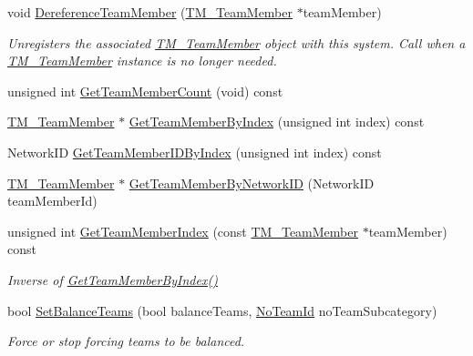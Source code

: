 \begin{DoxyCompactItemize}
void \hyperlink{class_rak_net_1_1_t_m___world_a165d4a76ef25f863832e2b161f5ad65e}{Dereference\-Team\-Member} (\hyperlink{class_rak_net_1_1_t_m___team_member}{T\-M\-\_\-\-Team\-Member} $\ast$team\-Member)
\begin{DoxyCompactList}\small\item\em Unregisters the associated \hyperlink{class_rak_net_1_1_t_m___team_member}{T\-M\-\_\-\-Team\-Member} object with this system. Call when a \hyperlink{class_rak_net_1_1_t_m___team_member}{T\-M\-\_\-\-Team\-Member} instance is no longer needed. \end{DoxyCompactList}\item 
unsigned int \hyperlink{class_rak_net_1_1_t_m___world_a15184c05210e998e0423cbd7761d5d14}{Get\-Team\-Member\-Count} (void) const 
\item 
\hyperlink{class_rak_net_1_1_t_m___team_member}{T\-M\-\_\-\-Team\-Member} $\ast$ \hyperlink{class_rak_net_1_1_t_m___world_a379fb348c0e195f8ffb26b1bf9b77d58}{Get\-Team\-Member\-By\-Index} (unsigned int index) const 
\item 
Network\-I\-D \hyperlink{class_rak_net_1_1_t_m___world_a94e7ff18a9c8d1f8ee15fdc549969a70}{Get\-Team\-Member\-I\-D\-By\-Index} (unsigned int index) const 
\item 
\hyperlink{class_rak_net_1_1_t_m___team_member}{T\-M\-\_\-\-Team\-Member} $\ast$ \hyperlink{class_rak_net_1_1_t_m___world_ad807e20ea5c412f6dc320ca8791f34ee}{Get\-Team\-Member\-By\-Network\-I\-D} (Network\-I\-D team\-Member\-Id)
\item 
unsigned int \hyperlink{class_rak_net_1_1_t_m___world_abd1031731c52b56fa3c4d7064e77cb0d}{Get\-Team\-Member\-Index} (const \hyperlink{class_rak_net_1_1_t_m___team_member}{T\-M\-\_\-\-Team\-Member} $\ast$team\-Member) const 
\begin{DoxyCompactList}\small\item\em Inverse of \hyperlink{class_rak_net_1_1_t_m___world_a379fb348c0e195f8ffb26b1bf9b77d58}{Get\-Team\-Member\-By\-Index()} \end{DoxyCompactList}\item 
bool \hyperlink{class_rak_net_1_1_t_m___world_a4e7c82a962fd92acc364383598570eca}{Set\-Balance\-Teams} (bool balance\-Teams, \hyperlink{group___t_e_a_m___m_a_n_a_g_e_r___g_r_o_u_p_gadd1e99b7724ceb0f6794f46de31a6b02}{No\-Team\-Id} no\-Team\-Subcategory)
\begin{DoxyCompactList}\small\item\em Force or stop forcing teams to be balanced. \end{DoxyCompactList}\item 

\end{DoxyCompactItemize}

